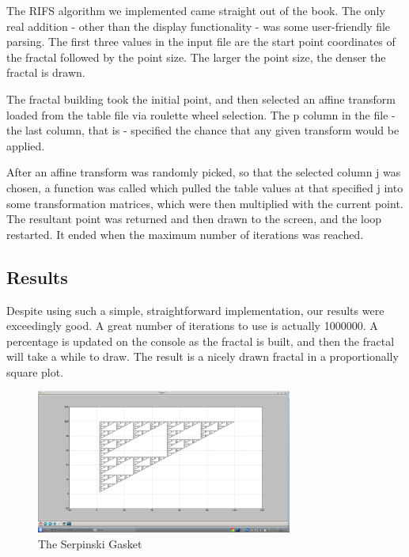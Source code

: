 The RIFS algorithm we implemented came straight out of the book.  The only real addition - other than the display functionality - was some user-friendly file parsing.  The first three values in the input file are the start point coordinates of the fractal followed by the point size.  The larger the point size, the denser the fractal is drawn.

The fractal building took the initial point, and then selected an affine transform loaded from the table file via roulette wheel selection.  The p column in the file - the last column, that is - specified the chance that any given transform would be applied.

After an affine transform was randomly picked, so that the selected column j was chosen, a function was called which pulled the table values at that specified j into some transformation matrices, which were then multiplied with the current point.  The resultant point was returned and then drawn to the screen, and the loop restarted.  It ended when the maximum number of iterations was reached.

\subsection{Results}

Despite using such a simple, straightforward implementation, our results were exceedingly good.  A great number of iterations to use is actually 1000000.   A percentage is updated on the console as the fractal is built, and then the fractal will take a while to draw.  The result is a nicely drawn fractal in a proportionally square plot.


\begin{figure}[tbh]
\begin{center}
\includegraphics[width=0.75\textwidth]{s_gasket.png}
\end{center}
\caption{The Serpinski Gasket\label{fig:gprun}}
\end{figure}

